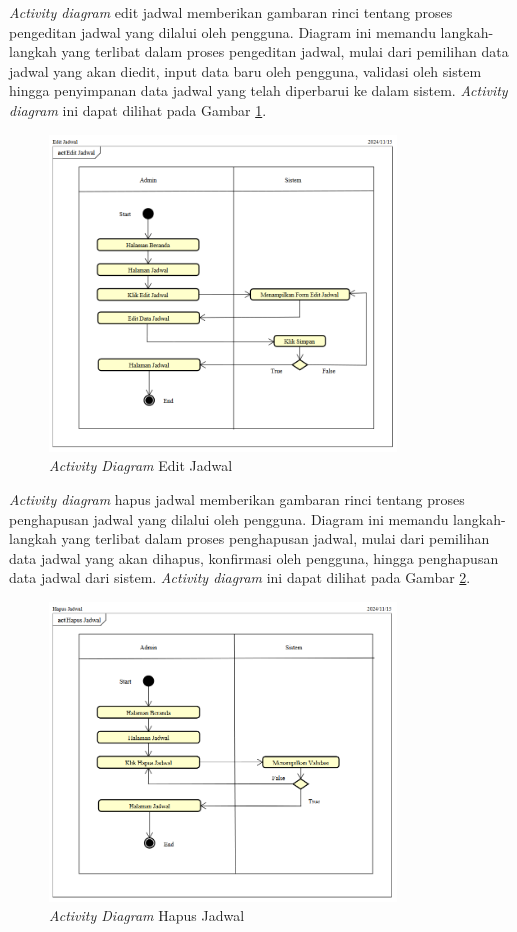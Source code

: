 \textit{Activity diagram} edit jadwal memberikan gambaran rinci tentang proses pengeditan jadwal yang dilalui oleh pengguna. Diagram ini memandu langkah-langkah yang terlibat dalam proses pengeditan jadwal, mulai dari pemilihan data jadwal yang akan diedit, input data baru oleh pengguna, validasi oleh sistem hingga penyimpanan data jadwal yang telah diperbarui ke dalam sistem. \textit{Activity diagram} ini dapat dilihat pada Gambar \ref{activity-diagram-edit-jadwal}.
\begin{figure}
	\centering
	\includegraphics[width=0.82\textwidth]{konten/gambar/activity-diagram/edit-jadwal.png}
	\caption{\textit{Activity Diagram} Edit Jadwal}
	\label{activity-diagram-edit-jadwal}
\end{figure}

\textit{Activity diagram} hapus jadwal memberikan gambaran rinci tentang proses penghapusan jadwal yang dilalui oleh pengguna. Diagram ini memandu langkah-langkah yang terlibat dalam proses penghapusan jadwal, mulai dari pemilihan data jadwal yang akan dihapus, konfirmasi oleh pengguna, hingga penghapusan data jadwal dari sistem. \textit{Activity diagram} ini dapat dilihat pada Gambar \ref{activity-diagram-hapus-jadwal}.
\begin{figure}
	\centering
	\includegraphics[width=0.82\textwidth]{konten/gambar/activity-diagram/hapus-jadwal.png}
	\caption{\textit{Activity Diagram} Hapus Jadwal}
	\label{activity-diagram-hapus-jadwal}
\end{figure}

